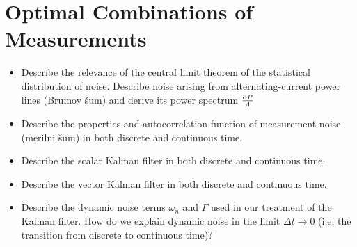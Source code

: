 



\tableofcontents

\section{Optimal Combinations of Measurements}
\begin{itemize}

    \item Describe the relevance of the central limit theorem of the statistical distribution of noise.
    Describe noise arising from alternating-current power lines (Brumov šum) and derive its power spectrum $\dv{P}{} $

    \item Describe the properties and autocorrelation function of measurement noise (merilni šum) in both discrete and continuous time.

    \item Describe the scalar Kalman filter in both discrete and continuous time.

    \item Describe the vector Kalman filter in both discrete and continuous time.

    \item Describe the dynamic noise terms $\omega_{n}$ and $\Gamma$ used in our treatment of the Kalman filter.
    How do we explain dynamic noise in the limit $\Delta t \to 0$ (i.e. the transition from discrete to continuous time)?

\end{itemize}

